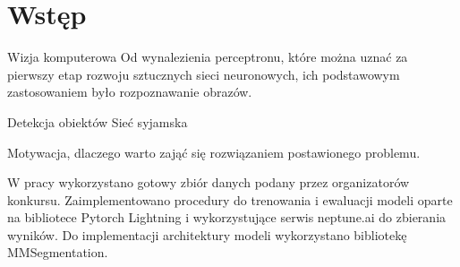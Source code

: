 \newpage %
\section{Wstęp}
Wizja komputerowa
Od wynalezienia perceptronu, które można uznać za pierwszy etap rozwoju sztucznych sieci neuronowych, ich podstawowym zastosowaniem było rozpoznawanie obrazów. 

Detekcja obiektów
Sieć syjamska

Motywacja, dlaczego warto zająć się rozwiązaniem postawionego problemu.

W pracy wykorzystano gotowy zbiór danych podany przez organizatorów konkursu. Zaimplementowano procedury do trenowania i ewaluacji modeli oparte na bibliotece Pytorch Lightning i wykorzystujące serwis neptune.ai do zbierania wyników. Do implementacji architektury modeli wykorzystano bibliotekę MMSegmentation.
